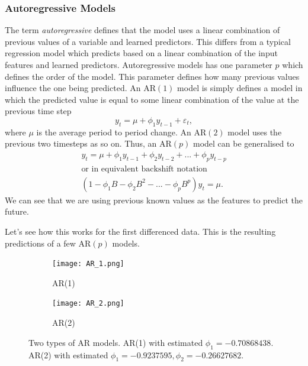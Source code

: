 \documentclass{article}
\begin{document}
  \subsubsection{Autoregressive Models}
    The term \emph{autoregressive} defines that the model uses a linear combination of previous values of a variable and learned predictors. This differs from a typical regression model which predicts based on a linear combination of the input features and learned predictors.
    Autoregressive models has one parameter $p$ which defines the order of the model. This parameter defines how many previous values influence the one being predicted. 
    An AR$(1)$ model is simply defines a model in which the predicted value is equal to some linear combination of the value at the previous time step
    \begin{equation*}
      y_t = \mu + \phi_1 y_{t-1} + \varepsilon_t,
    \end{equation*}
    where $\mu$ is the average period to period change.
    An AR$(2)$ model uses the previous two timesteps as so on.
    Thus, an AR$(p)$ model can be generalised to
    \begin{gather*}
      y_t = \mu + \phi_1 y_{t-1} + \phi_2 y_{t-2} + ... + \phi_p y_{t-p}\\
      \text{or in equivalent backshift notation}\\
      (1 - \phi_1B - \phi_2B^2 - ... - \phi_pB^p)y_t = \mu.
    \end{gather*}
    We can see that we are using previous known values as the features to predict the future.

    Let's see how this works for the first differenced data. This is the resulting predictions of a few AR$(p)$ models.

    \begin{figure}[H]
      \centering
      \captionsetup{justification=centering}
      \begin{subfigure}[b]{0.49\linewidth}
        \texttt{[image: AR\_1.png]}
        \caption{AR(1)}
      \end{subfigure}
      \begin{subfigure}[b]{0.49\linewidth}
        \texttt{[image: AR\_2.png]}
        \caption{AR(2)}
      \end{subfigure}
      \caption{Two types of AR models. AR(1) with estimated $\phi_1 = -0.70868438$. AR(2) with estimated $\phi_1 = -0.9237595, \phi_2 =   -0.26627682$.}
    \end{figure}
\end{document}

